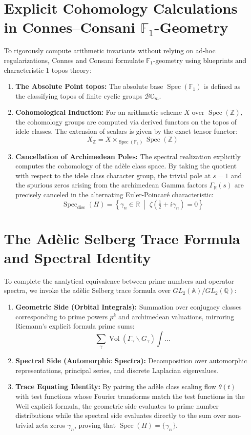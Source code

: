 \documentclass[11pt,a4paper]{article}
\begin{document}
\section{Explicit Cohomology Calculations in Connes--Consani $\mathbb{F}_1$-Geometry}
To rigorously compute arithmetic invariants without relying on ad-hoc regularizations, Connes and Consani formulate $\mathbb{F}_1$-geometry using blueprints and characteristic $1$ topos theory:
\begin{enumerate}
    \item \textbf{The Absolute Point topos:} The absolute base $\operatorname{Spec}(\mathbb{F}_1)$ is defined as the classifying topos of finite cyclic groups $\mathcal{B}\mathbb{G}_m$. 
    \item \textbf{Cohomological Induction:} For an arithmetic scheme $X$ over $\operatorname{Spec}(\mathbb{Z})$, the cohomology groups are computed via derived functors on the topos of idele classes. The extension of scalars is given by the exact tensor functor:
    $$X_{\mathbb{Z}} = X \times_{\operatorname{Spec}(\mathbb{F}_1)} \operatorname{Spec}(\mathbb{Z})$$
    \item \textbf{Cancellation of Archimedean Poles:} The spectral realization explicitly computes the cohomology of the ad\`{e}le class space. By taking the quotient with respect to the idele class character group, the trivial pole at $s=1$ and the spurious zeros arising from the archimedean Gamma factors $\Gamma_\mathbb{R}(s)$ are precisely canceled in the alternating Euler-Poincar\'{e} characteristic:
    $$\operatorname{Spec}_{\text{disc}}(H) = \left\{ \gamma_n \in \mathbb{R} \;\middle|\; \zeta\left(\tfrac{1}{2} + i\gamma_n\right) = 0 \right\}$$
\end{enumerate}

\section{The Ad\`{e}lic Selberg Trace Formula and Spectral Identity}
To complete the analytical equivalence between prime numbers and operator spectra, we invoke the ad\`{e}lic Selberg trace formula over $GL_2(\mathbb{A}) / GL_2(\mathbb{Q})$:
\begin{enumerate}
    \item \textbf{Geometric Side (Orbital Integrals):} Summation over conjugacy classes corresponding to prime powers $p^k$ and archimedean valuations, mirroring Riemann's explicit formula prime sums:
    $$\sum_{\gamma} \operatorname{Vol}(\Gamma_\gamma \backslash G_\gamma) \int \dots$$
    \item \textbf{Spectral Side (Automorphic Spectra):} Decomposition over automorphic representations, principal series, and discrete Laplacian eigenvalues.
    \item \textbf{Trace Equating Identity:} By pairing the ad\`{e}le class scaling flow $\theta(t)$ with test functions whose Fourier transforms match the test functions in the Weil explicit formula, the geometric side evaluates to prime number distributions while the spectral side evaluates directly to the sum over non-trivial zeta zeros $\gamma_n$, proving that $\operatorname{Spec}(H) = \{\gamma_n\}$.
\end{enumerate}
\end{document}

